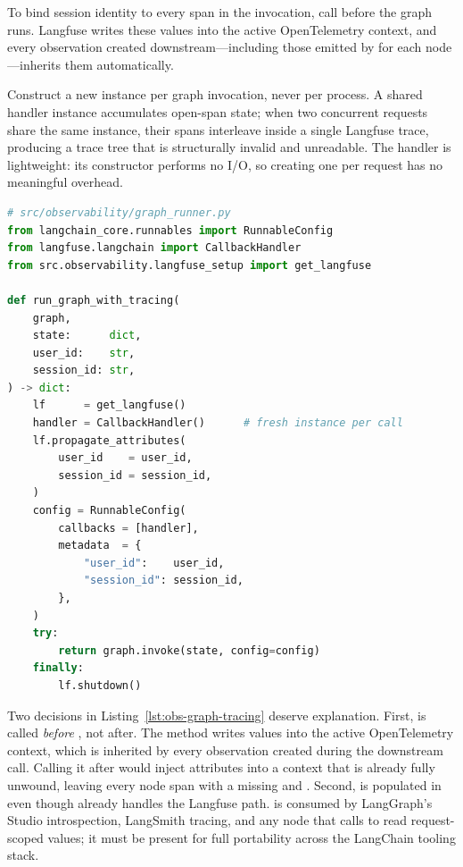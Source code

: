 To bind session identity to every span in the invocation, call
 before the graph runs.
Langfuse writes these values into the active OpenTelemetry context, and
every observation created downstream---including those emitted by
 for each node---inherits them automatically.

\begin{warningbox}
Construct a new  instance per graph invocation,
never per process. A shared handler instance accumulates open-span
state; when two concurrent requests share the same instance, their spans
interleave inside a single Langfuse trace, producing a trace tree that
is structurally invalid and unreadable. The handler is lightweight: its
constructor performs no I/O, so creating one per request has no
meaningful overhead.
\end{warningbox}

\begin{lstlisting}[language=Python,
  caption={Per-invocation \code{CallbackHandler} and attribute
  propagation via \code{RunnableConfig}},
  label={lst:obs-graph-tracing}]
# src/observability/graph_runner.py
from langchain_core.runnables import RunnableConfig
from langfuse.langchain import CallbackHandler
from src.observability.langfuse_setup import get_langfuse

def run_graph_with_tracing(
    graph,
    state:      dict,
    user_id:    str,
    session_id: str,
) -> dict:
    lf      = get_langfuse()
    handler = CallbackHandler()      # fresh instance per call
    lf.propagate_attributes(
        user_id    = user_id,
        session_id = session_id,
    )
    config = RunnableConfig(
        callbacks = [handler],
        metadata  = {
            "user_id":    user_id,
            "session_id": session_id,
        },
    )
    try:
        return graph.invoke(state, config=config)
    finally:
        lf.shutdown()
\end{lstlisting}

Two decisions in Listing~\ref{lst:obs-graph-tracing} deserve explanation.
First,  is called \emph{before}
, not after. The method writes values into the
active OpenTelemetry context, which is inherited by every observation
created during the downstream call. Calling it after 
would inject attributes into a context that is already fully unwound,
leaving every node span with a missing  and
. Second,  is populated in
 even though  already
handles the Langfuse path.  is consumed
by LangGraph's Studio introspection, LangSmith tracing, and any node
that calls  to read request-scoped
values; it must be present for full portability across the LangChain
tooling stack.

